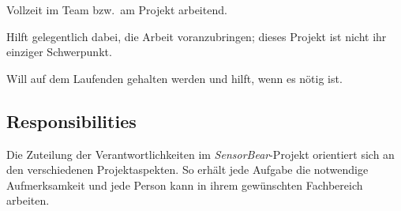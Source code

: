 \documentclass{article}
\begin{document}
\begin{description}[leftmargin=2.8cm,style=nextline]
  \item[Core Team] Vollzeit im Team bzw.\ am Projekt arbeitend.
  \item[Involved] Hilft gelegentlich dabei, die Arbeit voranzubringen; dieses Projekt ist nicht ihr einziger Schwerpunkt.
  \item[Informed] Will auf dem Laufenden gehalten werden und hilft, wenn es nötig ist.
\end{description}






\subsection{Responsibilities}

Die Zuteilung der Verantwortlichkeiten im \textit{SensorBear}-Projekt orientiert sich an den verschiedenen Projektaspekten. So erhält jede Aufgabe die notwendige Aufmerksamkeit und jede Person kann in ihrem gewünschten Fachbereich arbeiten.
\end{document}
